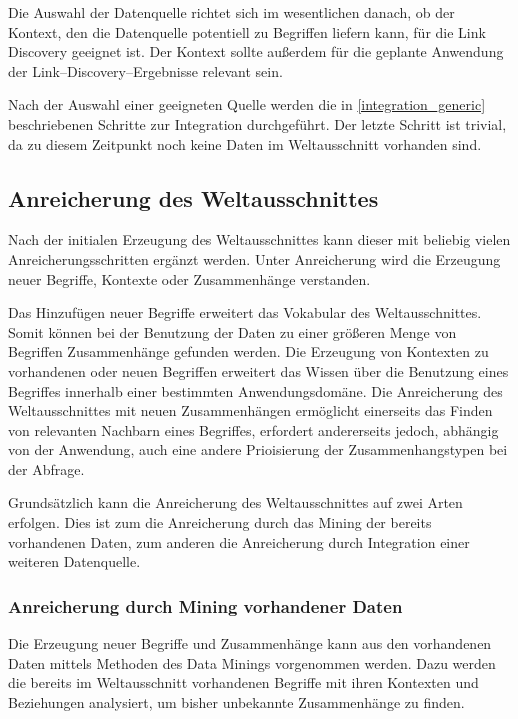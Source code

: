 Die Auswahl der Datenquelle richtet sich im wesentlichen danach, ob der Kontext, den die Datenquelle potentiell zu Begriffen liefern kann, für die Link Discovery geeignet ist. Der Kontext sollte außerdem für die geplante Anwendung der Link--Discovery--Ergebnisse relevant sein.

Nach der Auswahl einer geeigneten Quelle werden die in \cref{integration_generic} beschriebenen Schritte zur Integration durchgeführt. Der letzte Schritt ist trivial, da zu diesem Zeitpunkt noch keine Daten im Weltausschnitt vorhanden sind.

\subsection{Anreicherung des Weltausschnittes}

Nach der initialen Erzeugung des Weltausschnittes kann dieser mit beliebig vielen Anreicherungsschritten ergänzt werden. Unter Anreicherung wird die Erzeugung neuer Begriffe, Kontexte oder Zusammenhänge verstanden.

Das Hinzufügen neuer Begriffe erweitert das Vokabular des Weltausschnittes. Somit können bei der Benutzung der Daten zu einer größeren Menge von Begriffen Zusammenhänge gefunden werden. Die Erzeugung von Kontexten zu vorhandenen oder neuen Begriffen erweitert das Wissen über die Benutzung eines Begriffes innerhalb einer bestimmten Anwendungsdomäne. Die Anreicherung des Weltausschnittes mit neuen Zusammenhängen ermöglicht einerseits das Finden von relevanten Nachbarn eines Begriffes, erfordert andererseits jedoch, abhängig von der Anwendung, auch eine andere Prioisierung der Zusammenhangstypen bei der Abfrage.

Grundsätzlich kann die Anreicherung des Weltausschnittes auf zwei Arten erfolgen. Dies ist zum die Anreicherung durch das Mining der bereits vorhandenen Daten, zum anderen die Anreicherung durch Integration einer weiteren Datenquelle.

\subsubsection{Anreicherung durch Mining vorhandener Daten}

Die Erzeugung neuer Begriffe und Zusammenhänge kann aus den vorhandenen Daten mittels Methoden des Data Minings vorgenommen werden. Dazu werden die bereits im Weltausschnitt vorhandenen Begriffe mit ihren Kontexten und Beziehungen analysiert, um bisher unbekannte Zusammenhänge zu finden.

